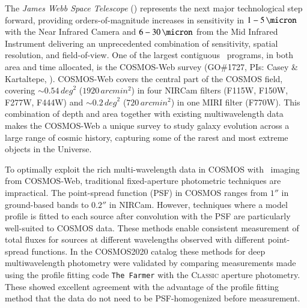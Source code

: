 \documentclass[longauth]{aa}
\begin{document}
The \textit{James Webb Space Telescope} (\JWST) represents the next major technological step forward, providing orders-of-magnitude increases in sensitivity in $1-5\, \si{\micron}$ with the Near Infrared Camera \citep[NIRCam,][]{RiekeNIRCAM} and $6-30\, \si{\micron}$ from the Mid Infrared Instrument \citep[MIRI,][]{WrightMIRI} delivering an unprecedented combination of sensitivity, spatial resolution, and field-of-view. One of the largest contiguous \JWST\ programs, in both area and time allocated, is the COSMOS-Web survey (GO\#1727, PIs: Casey \& Kartaltepe, \citealt{Casey2023CW}). COSMOS-Web covers the central part of the COSMOS field, covering $\sim 0.54\, \si{deg}^2$ ($1920\, \si{arcmin}^2$) in four NIRCam filters (F115W, F150W, F277W, F444W) and $\sim0.2\, \si{deg}^2$ ($720\, \si{arcmin}^2$) in one MIRI filter (F770W). This combination of depth and area together with existing multiwavelength data makes the COSMOS-Web a unique survey to study galaxy evolution across a large range of cosmic history, capturing some of the rarest and most extreme objects in the Universe. 

To optimally exploit the rich  multi-wavelength data in COSMOS with \JWST\ imaging from COSMOS-Web, traditional fixed-aperture photometric techniques are impractical. The point-spread function (PSF) in COSMOS ranges from $\ang{;;1}$ in ground-based bands to $\ang{;;0.2}$ in NIRCam. However, techniques where a model profile is fitted to each source after convolution with the PSF are particularly well-suited to COSMOS data. These methods enable consistent measurement of total fluxes for sources at different wavelengths observed with different point-spread functions. In the COSMOS2020 catalog \citep{weaver_cosmos2020_2022} these methods for deep multiwavelength photometry were validated by comparing measurements made using the profile fitting code \texttt{The Farmer} \citep{WeaverFarmer2023} with the \textsc{Classic} aperture photometry. These showed excellent agreement with the advantage of the profile fitting method that the data do not need to be PSF-homogenized before measurement. 
\end{document}
